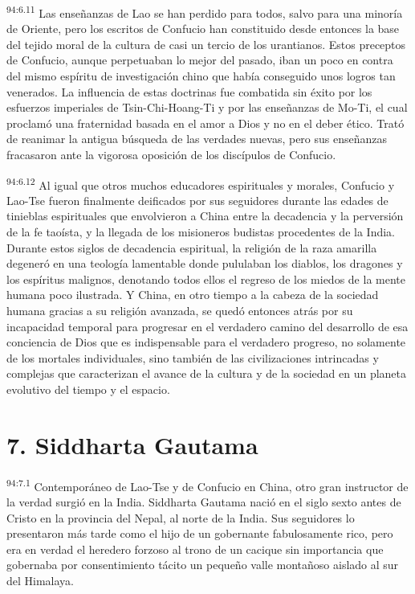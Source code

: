 \par
\textsuperscript{94:6.11} Las enseñanzas de Lao se han perdido para todos, salvo para una minoría de Oriente, pero los escritos de Confucio han constituido desde entonces la base del tejido moral de la cultura de casi un tercio de los urantianos. Estos preceptos de Confucio, aunque perpetuaban lo mejor del pasado, iban un poco en contra del mismo espíritu de investigación chino que había conseguido unos logros tan venerados. La influencia de estas doctrinas fue combatida sin éxito por los esfuerzos imperiales de Tsin-Chi-Hoang-Ti y por las enseñanzas de Mo-Ti, el cual proclamó una fraternidad basada en el amor a Dios y no en el deber ético. Trató de reanimar la antigua búsqueda de las verdades nuevas, pero sus enseñanzas fracasaron ante la vigorosa oposición de los discípulos de Confucio.

\par
\textsuperscript{94:6.12} Al igual que otros muchos educadores espirituales y morales, Confucio y Lao-Tse fueron finalmente deificados por sus seguidores durante las edades de tinieblas espirituales que envolvieron a China entre la decadencia y la perversión de la fe taoísta, y la llegada de los misioneros budistas procedentes de la India. Durante estos siglos de decadencia espiritual, la religión de la raza amarilla degeneró en una teología lamentable donde pululaban los diablos, los dragones y los espíritus malignos, denotando todos ellos el regreso de los miedos de la mente humana poco ilustrada. Y China, en otro tiempo a la cabeza de la sociedad humana gracias a su religión avanzada, se quedó entonces atrás por su incapacidad temporal para progresar en el verdadero camino del desarrollo de esa conciencia de Dios que es indispensable para el verdadero progreso, no solamente de los mortales individuales, sino también de las civilizaciones intrincadas y complejas que caracterizan el avance de la cultura y de la sociedad en un planeta evolutivo del tiempo y el espacio.

\section*{7. Siddharta Gautama}
\par
\textsuperscript{94:7.1} Contemporáneo de Lao-Tse y de Confucio en China, otro gran instructor de la verdad surgió en la India. Siddharta Gautama nació en el siglo sexto antes de Cristo en la provincia del Nepal, al norte de la India. Sus seguidores lo presentaron más tarde como el hijo de un gobernante fabulosamente rico, pero era en verdad el heredero forzoso al trono de un cacique sin importancia que gobernaba por consentimiento tácito un pequeño valle montañoso aislado al sur del Himalaya.

